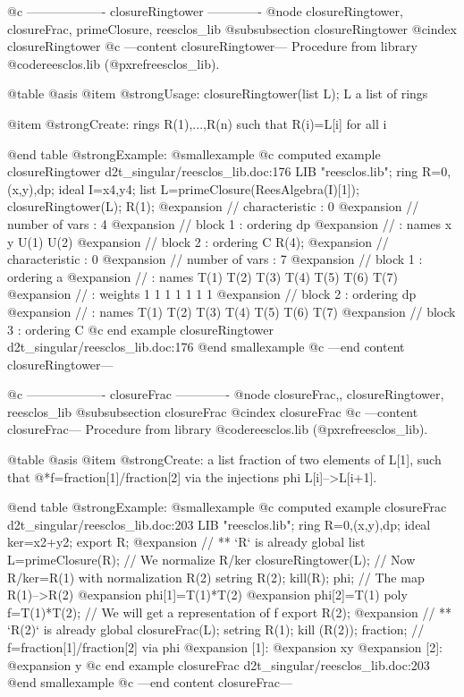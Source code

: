 @c ------------------- closureRingtower -------------
@node closureRingtower, closureFrac, primeClosure, reesclos_lib
@subsubsection closureRingtower
@cindex closureRingtower
@c ---content closureRingtower---
Procedure from library @code{reesclos.lib} (@pxref{reesclos_lib}).

@table @asis
@item @strong{Usage:}
closureRingtower(list L); L a list of rings

@item @strong{Create:}
rings R(1),...,R(n) such that R(i)=L[i] for all i

@end table
@strong{Example:}
@smallexample
@c computed example closureRingtower d2t_singular/reesclos_lib.doc:176 
LIB "reesclos.lib";
ring R=0,(x,y),dp;
ideal I=x4,y4;
list L=primeClosure(ReesAlgebra(I)[1]);
closureRingtower(L);
R(1);
@expansion{} //   characteristic : 0
@expansion{} //   number of vars : 4
@expansion{} //        block   1 : ordering dp
@expansion{} //                  : names    x y U(1) U(2) 
@expansion{} //        block   2 : ordering C
R(4);
@expansion{} //   characteristic : 0
@expansion{} //   number of vars : 7
@expansion{} //        block   1 : ordering a
@expansion{} //                  : names    T(1) T(2) T(3) T(4) T(5) T(6) T(7) 
@expansion{} //                  : weights     1    1    1    1    1    1    1 
@expansion{} //        block   2 : ordering dp
@expansion{} //                  : names    T(1) T(2) T(3) T(4) T(5) T(6) T(7) 
@expansion{} //        block   3 : ordering C
@c end example closureRingtower d2t_singular/reesclos_lib.doc:176
@end smallexample
@c ---end content closureRingtower---

@c ------------------- closureFrac -------------
@node closureFrac,, closureRingtower, reesclos_lib
@subsubsection closureFrac
@cindex closureFrac
@c ---content closureFrac---
Procedure from library @code{reesclos.lib} (@pxref{reesclos_lib}).

@table @asis
@item @strong{Create:}
a list fraction of two elements of L[1], such that
@*f=fraction[1]/fraction[2] via the injections phi L[i]-->L[i+1].

@end table
@strong{Example:}
@smallexample
@c computed example closureFrac d2t_singular/reesclos_lib.doc:203 
LIB "reesclos.lib";
ring R=0,(x,y),dp;
ideal ker=x2+y2;
export R;
@expansion{} // ** `R` is already global
list L=primeClosure(R);          // We normalize R/ker
closureRingtower(L);             // Now R/ker=R(1) with normalization R(2)
setring R(2);
kill(R);
phi;                             // The map R(1)-->R(2)
@expansion{} phi[1]=T(1)*T(2)
@expansion{} phi[2]=T(1)
poly f=T(1)*T(2);                // We will get a representation of f
export R(2);
@expansion{} // ** `R(2)` is already global
closureFrac(L);
setring R(1);
kill (R(2));
fraction;                        // f=fraction[1]/fraction[2] via phi
@expansion{} [1]:
@expansion{}    xy
@expansion{} [2]:
@expansion{}    y
@c end example closureFrac d2t_singular/reesclos_lib.doc:203
@end smallexample
@c ---end content closureFrac---

